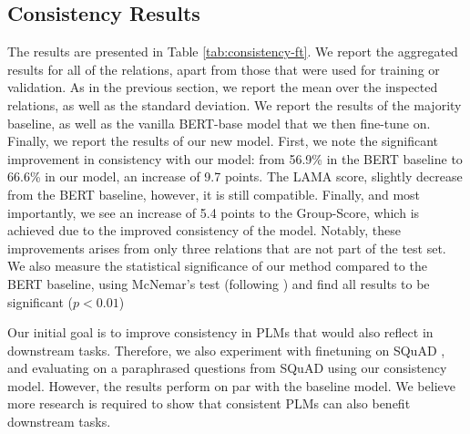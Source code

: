 \subsection{Consistency Results}



The results are presented in Table \ref{tab:consistency-ft}. We report the aggregated results for all of the relations, apart from those that were used for training or validation. As in the previous section, we report the mean over the inspected relations, as well as the standard deviation.
We report the results of the majority baseline, as well as the vanilla BERT-base model that we then fine-tune on. Finally, we report the results of our new model.
First, we note the significant improvement in consistency with our model: from 56.9\% in the BERT baseline to 66.6\% in our model, an increase of 9.7 points.
The LAMA score, slightly decrease from the BERT baseline, however, it is still compatible. Finally, and most importantly, we see an increase of 5.4 points to the Group-Score, which is achieved due to the improved consistency of the model.
Notably, these improvements arises from only three relations that are not part of the test set.
We also measure the statistical significance of our method compared to the BERT baseline, using McNemar's test (following \citet{dror2018hitchhiker,dror2020statistical}) and find all results to be significant ($p<0.01$)

Our initial goal is to improve consistency in PLMs that would also reflect in downstream tasks. Therefore, we also experiment with finetuning on SQuAD \cite{squad}, and evaluating on a paraphrased questions from SQuAD \cite{squad-paraphrase} using our consistency model. However, the results perform on par with the baseline model.
We believe more research is required to show that consistent PLMs can also benefit downstream tasks.


